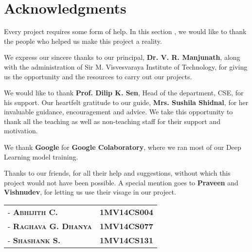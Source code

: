 \chapter*{Acknowledgments}
\noindent Every project requires some form of help. In this section , we would like to thank the people who helped us make this project a reality.
\par\bigskip
We express our sincere thanks to our principal, \textbf{Dr. V. R. Manjunath}, along with the administration of Sir M. Visvesvaraya Institute of Technology, for giving us the opportunity and the resources to carry out our projects.
\par\bigskip
We would like to thank \textbf{Prof. Dilip K. Sen}, Head of the department, CSE, for his support. Our heartfelt gratitude to our guide, \textbf{Mrs. Sushila Shidnal}, for her invaluable guidance, encouragement and advice. We take this opportunity to thank all the teaching as well as non-teaching staff for their support and motivation. 
\par\bigskip
We thank \textbf{Google} for \textbf{Google Colaboratory}, where we ran most of our Deep Learning model training.
\par\bigskip
Thanks to our friends, for all their help and suggestions, without which this project would not have been possible. A special mention goes to \textbf{Praveen} and \textbf{Vishnudev}, for letting us use their visage in our project.
\par\bigskip
\vspace{50px}
\noindent\hfill\begin{tabular}{ l r }
        \textsc{-  \textbf{Abhijith C.}}       &  \textbf{1MV14CS004} \\
        \textsc{-  \textbf{Raghava G. Dhanya}} &  \textbf{1MV14CS077} \\
        \textsc{-  \textbf{Shashank S.}}       &  \textbf{1MV14CS131}
\end{tabular}